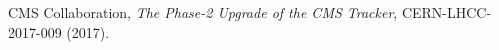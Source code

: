 \documentclass[a4paper,11pt]{article}
\begin{document}
\begin{thebibliography}{99}

%
%
%



%

CMS Collaboration, \emph{The Phase-2 Upgrade of the CMS Tracker},
CERN-LHCC-2017-009 (2017).

%


\end{thebibliography}
\end{document}
